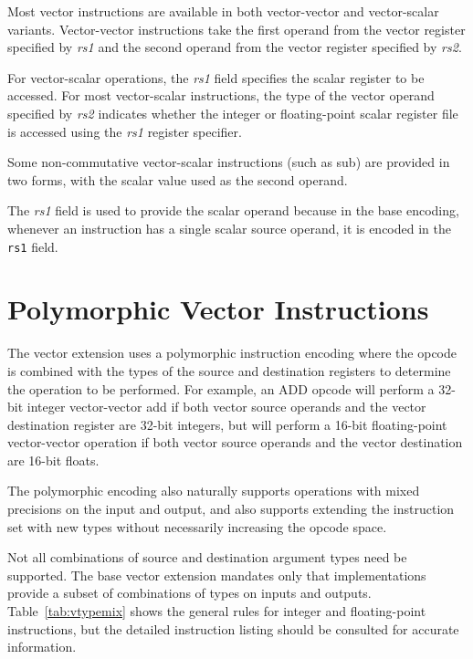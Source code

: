 Most vector instructions are available in both vector-vector and
vector-scalar variants.  Vector-vector instructions take the first
operand from the vector register specified by {\em rs1} and the second
operand from the vector register specified by {\em rs2}.

For vector-scalar operations, the {\em rs1} field specifies the scalar
register to be accessed.  For most vector-scalar instructions, the
type of the vector operand specified by {\em rs2} indicates whether
the integer or floating-point scalar register file is accessed using
the {\em rs1} register specifier.

Some non-commutative vector-scalar instructions (such as sub) are
provided in two forms, with the scalar value used as the second
operand.

\begin{commentary}
  The {\em rs1} field is used to provide the scalar operand because in
  the base encoding, whenever an instruction has a single scalar
  source operand, it is encoded in the {\tt rs1} field.
\end{commentary}

\section{Polymorphic Vector Instructions}

The vector extension uses a polymorphic instruction encoding where the
opcode is combined with the types of the source and destination
registers to determine the operation to be performed.  For example, an
ADD opcode will perform a 32-bit integer vector-vector add if both
vector source operands and the vector destination register are 32-bit
integers, but will perform a 16-bit floating-point vector-vector
operation if both vector source operands and the vector destination
are 16-bit floats.

The polymorphic encoding also naturally supports operations with mixed
precisions on the input and output, and also supports extending the
instruction set with new types without necessarily increasing the
opcode space.

Not all combinations of source and destination argument types need be
supported.  The base vector extension mandates only that
implementations provide a subset of combinations of types on inputs
and outputs.  Table~\ref{tab:vtypemix} shows the general rules for
integer and floating-point instructions, but the detailed instruction
listing should be consulted for accurate information.

